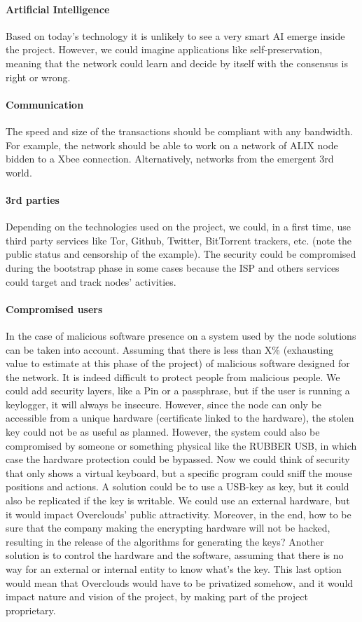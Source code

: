 \paragraph{Artificial Intelligence} Based on today's technology it is unlikely to see a very smart AI emerge inside the project. However, we could imagine applications like self-preservation, meaning that the network could learn and decide by itself with the consensus is right or wrong.

\paragraph{Communication} The speed and size of the transactions should be compliant with any bandwidth. For example, the network should be able to work on a network of ALIX node bidden to a Xbee connection. Alternatively, networks from the emergent 3rd world.

\paragraph{3rd parties} Depending on the technologies used on the project, we could, in a first time, use third party services like Tor, Github, Twitter, BitTorrent trackers, etc. (note the public status and censorship of the example). The security could be compromised during the bootstrap phase in some cases because the ISP and others services could target and track nodes' activities.

\paragraph{Compromised users} In the case of malicious software presence on a system used by the node solutions can be taken into account. Assuming that there is less than X\% (exhausting value to estimate at this phase of the project) of malicious software designed for the network. It is indeed difficult to protect people from malicious people. We could add security layers, like a Pin or a passphrase, but if the user is running a keylogger, it will always be insecure. However, since the node can only be accessible from a unique hardware (certificate linked to the hardware), the stolen key could not be as useful as planned. However, the system could also be compromised by someone or something physical like the RUBBER USB\cite{HakshopRubberUSB}, in which case the hardware protection could be bypassed. Now we could think of security that only shows a virtual keyboard, but a specific program could sniff the mouse positions and actions. A solution could be to use a USB-key as key, but it could also be replicated if the key is writable. We could use an external hardware, but it would impact Overclouds' public attractivity. Moreover, in the end, how to be sure that the company making the encrypting hardware will not be hacked, resulting in the release of the algorithms for generating the keys? Another solution is to control the hardware and the software, assuming that there is no way for an external or internal entity to know what's the key. This last option would mean that Overclouds would have to be privatized somehow, and it would impact nature and vision of the project, by making part of the project proprietary.

